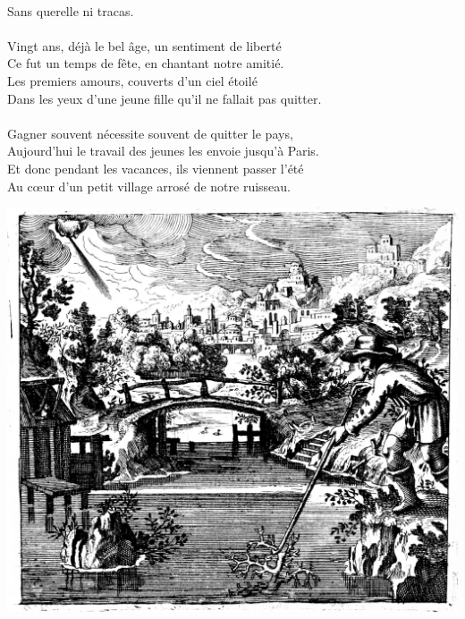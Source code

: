 \\Sans querelle ni tracas.
\\\\Vingt ans, déjà le bel âge, un sentiment de liberté
\\Ce fut un temps de fête, en chantant notre amitié.
\\Les premiers amours, couverts d'un ciel étoilé
\\Dans les yeux d'une jeune fille qu'il ne fallait pas quitter.
\breakpage
\\\\Gagner souvent nécessite souvent de quitter le pays,
\\Aujourd'hui le travail des jeunes les envoie jusqu'à Paris.
\\Et donc pendant les vacances, ils viennent passer l'été
\\Au cœur d'un petit village arrosé de notre ruisseau.

\vspace{1cm}
\begin{center}
\includegraphics[width=1\textwidth]{images/brev33.png}
\end{center}

\breakpage